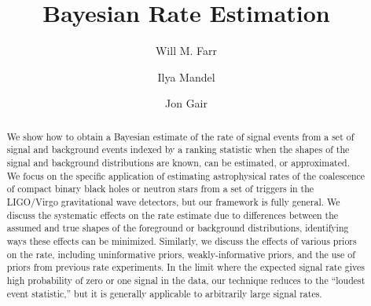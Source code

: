 \documentclass[aps,prd,reprint]{revtex4-1}
\begin{document}
\title{Bayesian Rate Estimation}

\author{Will M. Farr}


\author{Ilya Mandel}

\author{Jon Gair}

\begin{abstract}
  We show how to obtain a Bayesian estimate of the rate of signal
  events from a set of signal and background events indexed by a
  ranking statistic when the shapes of the signal and background
  distributions are known, can be estimated, or approximated.  We
  focus on the specific application of estimating astrophysical rates
  of the coalescence of compact binary black holes or neutron stars
  from a set of triggers in the LIGO/Virgo gravitational wave
  detectors, but our framework is fully general.  We discuss the
  systematic effects on the rate estimate due to differences between
  the assumed and true shapes of the foreground or background
  distributions, identifying ways these effects can be minimized.
  Similarly, we discuss the effects of various priors on the rate,
  including uninformative priors, weakly-informative priors, and the
  use of priors from previous rate experiments.  In the limit where
  the expected signal rate gives high probability of zero or one
  signal in the data, our technique reduces to the ``loudest event
  statistic,'' but it is generally applicable to arbitrarily large
  signal rates.
\end{abstract}

\maketitle
\end{document}
